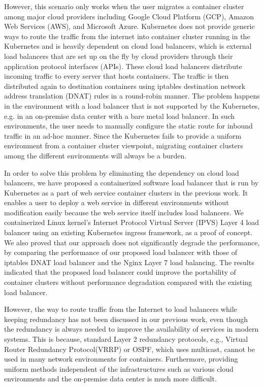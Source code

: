 However, this scenario only works when the user migrates a container cluster among major cloud providers including Google Cloud Platform (GCP), 
Amazon Web Services (AWS), and Microsoft Azure.
Kubernetes does not provide generic ways to route the traffic from the internet into container cluster running in the Kubernetes and is 
heavily dependent on cloud load balancers, which is external load balancers that are set up on the fly by cloud providers through their application protocol interfaces (APIs).
%
These cloud load balancers distribute incoming traffic to every server that hosts containers.
The traffic is then distributed again to destination containers using iptables destination 
network address translation (DNAT)\cite{MartinA.Brown2017,Marmol2015} rules in a round-robin manner. 
The problem happens in the environment with a load balancer that is not supported by the Kubernetes, 
e.g. in an on-premise data center with a bare metal load balancer. 
In such environments, the user needs to manually configure 
the static route for inbound traffic in an ad-hoc manner. 
Since the Kubernetes fails to provide a uniform environment from a container cluster viewpoint,
migrating container clusters among the different environments will always be a burden.

In order to solve this problem by eliminating the dependency on cloud load balancers,
we have proposed a containerized software load balancer that is run by Kubernetes as  
a part of web service container clusters in the previous work\cite{takahashi2018portable}.
It enables a user to deploy a web service in different environments without modification easily 
because the web service itself includes load balancers.
%
We containerized Linux kernel's Internet Protocol Virtual Server (IPVS)\cite{Zhang2000} 
Layer 4 load balancer using an existing Kubernetes ingress\cite{K8sIngress2017} framework, as a proof of concept.
%
%
We also proved that our approach does not significantly degrade the performance,
by comparing the performance of our proposed load balancer with those of
iptables DNAT load balancer and the Nginx Layer 7 load balancing.
%
The results indicated that the proposed load balancer could improve the portability of container clusters without performance degradation compared with the existing load balancer.

However, the way to route traffic from the Internet to load balancers while keeping redundancy has not been discussed in our previous work, even though the redundancy is always needed to improve the availability of services in modern systems.
This is because, standard Layer 2 redundancy protocols, e.g., Virtual Router Redundancy Protocol(VRRP)\cite{hinden2004virtual}
or OSPF\cite{moy1997ospf}, which uses multicast, cannot be used in many network environments for containers.
Furthermore, providing uniform methods independent of the infrastructures such as various cloud environments and the on-premise data center is much more difficult.

